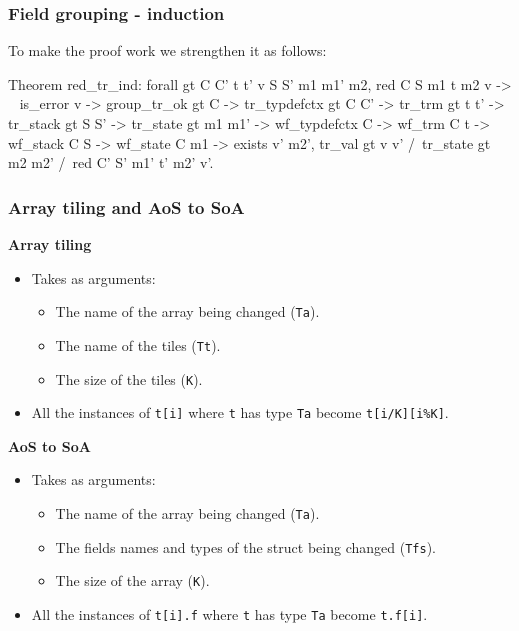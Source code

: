 \begin{frame}[fragile]
\frametitle{Field grouping - induction}

To make the proof work we strengthen it as follows:

\begin{coq}
  Theorem red_tr_ind: forall gt C C' t t' v S S' m1 m1' m2,
    red C S m1 t m2 v ->
    ~ is_error v ->
    group_tr_ok gt C ->
    tr_typdefctx gt C C' ->
    tr_trm gt t t' ->
    tr_stack gt S S' ->
    tr_state gt m1 m1' ->
    wf_typdefctx C ->
    wf_trm C t ->
    wf_stack C S ->
    wf_state C m1 ->
    exists v' m2',				tr_val gt v v'
			  /\	tr_state gt m2 m2'
			  /\	red C' S' m1' t' m2' v'.
\end{coq}

\end{frame}


\begin{frame}[fragile]
\frametitle{}


\end{frame}


\begin{frame}[fragile]
\frametitle{Array tiling and AoS to SoA}

\textbf{Array tiling}
\begin{itemize}
	\item Takes as arguments:
	\begin{itemize}
		\item The name of the array being changed (\texttt{Ta}).
		\item The name of the tiles (\texttt{Tt}).
		\item The size of the tiles (\texttt{K}).
	\end{itemize}
	\item All the instances of \texttt{t[i]} where \texttt{t} has type \texttt{Ta} become \texttt{t[i/K][i\%K]}.
\end{itemize}

\bigskip

\textbf{AoS to SoA}
\begin{itemize}
	\item Takes as arguments:
	\begin{itemize}
		\item The name of the array being changed (\texttt{Ta}).
		\item The fields names and types of the struct being changed (\texttt{Tfs}).
		\item The size of the array (\texttt{K}).
	\end{itemize}
	\item All the instances of \texttt{t[i].f} where \texttt{t} has type \texttt{Ta} become \texttt{t.f[i]}.
\end{itemize}

\end{frame}


